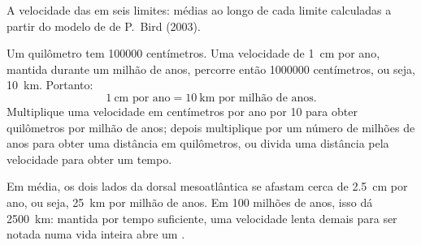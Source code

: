 \begin{omfigure}

{\small A velocidade das  em seis limites: médias ao longo de cada
limite calculadas a partir do modelo de  de P.~Bird (2003).}
\end{omfigure}

\begin{method}\label{met:g7:plate-tectonics:convert}
Um quilômetro tem \num{100000} centímetros. Uma velocidade de \qty{1}{cm}
por ano, mantida durante um milhão de anos, percorre então \num{1000000}
centímetros, ou seja, \qty{10}{km}. Portanto:
\[
  1\ \text{cm por ano} = 10\ \text{km por milhão de anos}.
\]
Multiplique uma velocidade em centímetros por ano por 10 para obter
quilômetros por milhão de anos; depois multiplique por um número de milhões
de anos para obter uma distância em quilômetros, ou divida uma distância
pela velocidade para obter um tempo.
\end{method}

\begin{example}\label{ex:g7:plate-tectonics:atlantic}
Em média, os dois lados da dorsal mesoatlântica se afastam cerca de
\qty{2.5}{cm} por ano, ou seja, \qty{25}{km} por milhão de anos. Em 100
milhões de anos, isso dá \qty{2500}{km}: mantida por tempo suficiente, uma
velocidade lenta demais para ser notada numa vida inteira abre um .
\end{example}

